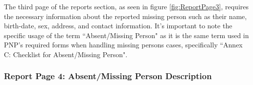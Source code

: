 The third page of the reports section, as seen in figure \ref{fig:ReportPage3}, requires the necessary information about the reported missing person such as their name, birth-date, sex, address, and contact information. It's important to note the specific usage of the term ``Absent/Missing Person" as it is the same term used in PNP's required forms when handling missing persons cases, specifically ``Annex C: Checklist for Absent/Missing Person".

\subsubsection{Report Page 4: Absent/Missing Person Description}

\begin{figure}[!h]
    \centering
    \begin{subfigure}[c]{0.30\linewidth}
        \centering

\end{subfigure}
\end{figure}
